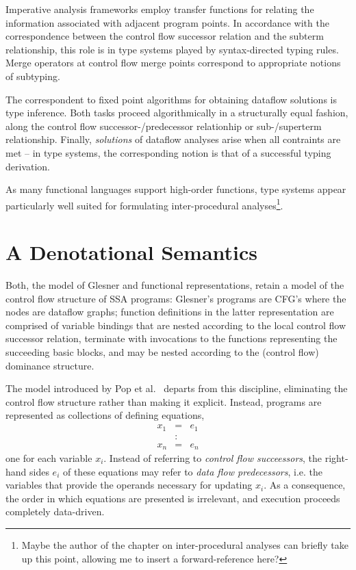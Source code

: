 Imperative analysis frameworks employ transfer functions for relating
the information associated with adjacent program points. In accordance
with the correspondence between the control flow successor relation and
the subterm relationship, this role is in type systems played by
syntax-directed typing rules. Merge operators at control flow merge
points correspond to appropriate notions of subtyping.

The correspondent to fixed point algorithms for obtaining dataflow
solutions is type inference. Both tasks proceed algorithmically in a
structurally equal fashion, along the control flow
successor-/predecessor relationhip or sub-/superterm relationship.
Finally, \emph{solutions} of dataflow analyses arise when
all contraints are met -- in type systems, the corresponding notion is
that of a successful typing derivation.

As many functional languages support high-order functions, type
systems appear particularly well suited for formulating
inter-procedural analyses\footnote{Maybe the author of the chapter on
inter-procedural analyses can briefly take up this point, allowing me
to insert a forward-reference here?}.


\section{A Denotational Semantics}
\label{section:Part1:Semantics:PopSemantics}
Both, the model of Glesner and functional representations, retain a
model of the control flow structure of SSA programs: Glesner's
programs are CFG's where the nodes are dataflow graphs; function
definitions in the latter representation are comprised of variable
bindings that are nested according to the local control flow successor
relation, terminate with invocations to the functions representing the
succeeding basic blocks, and may be nested according to the (control
flow) dominance structure.

The model introduced by Pop et al.~\cite{PopCJS2006} departs from this
discipline, eliminating the control flow structure rather than making
it explicit.  Instead, programs are represented as collections of
defining equations,
\begin{eqnarray*}
x_1 & = & e_1\\
& : &\\
x_n & = & e_n
\end{eqnarray*}
one for each variable $x_i$. Instead of referring to \emph{control
flow succeessors}, the right-hand sides $e_i$ of these equations may
refer to \emph{data flow predecessors}, i.e. the variables that
provide the operands necessary for updating $x_i$. As a
consequence, the order in which equations are presented is irrelevant,
and execution proceeds completely data-driven.

